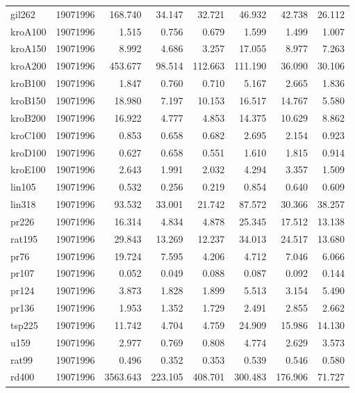 \begin{center}
\begin{longtable}{llrrrrrr}
gil262  & 19071996 & 168.740 & 34.147 & 32.721 & 46.932 & 42.738 & 26.112\\
kroA100  & 19071996 & 1.515 & 0.756 & 0.679 & 1.599 & 1.499 & 1.007\\
kroA150  & 19071996 & 8.992 & 4.686 & 3.257 & 17.055 & 8.977 & 7.263\\
kroA200  & 19071996 & 453.677 & 98.514 & 112.663 & 111.190 & 36.090 & 30.106\\
kroB100  & 19071996 & 1.847 & 0.760 & 0.710 & 5.167 & 2.665 & 1.836\\
kroB150  & 19071996 & 18.980 & 7.197 & 10.153 & 16.517 & 14.767 & 5.580\\
kroB200  & 19071996 & 16.922 & 4.777 & 4.853 & 14.375 & 10.629 & 8.862\\
kroC100  & 19071996 & 0.853 & 0.658 & 0.682 & 2.695 & 2.154 & 0.923\\
kroD100  & 19071996 & 0.627 & 0.658 & 0.551 & 1.610 & 1.815 & 0.914\\
kroE100  & 19071996 & 2.643 & 1.991 & 2.032 & 4.294 & 3.357 & 1.509\\
lin105  & 19071996 & 0.532 & 0.256 & 0.219 & 0.854 & 0.640 & 0.609\\
lin318  & 19071996 & 93.532 & 33.001 & 21.742 & 87.572 & 30.366 & 38.257\\
pr226  & 19071996 & 16.314 & 4.834 & 4.878 & 25.345 & 17.512 & 13.138\\
rat195  & 19071996 & 29.843 & 13.269 & 12.237 & 34.013 & 24.517 & 13.680\\
pr76  & 19071996 & 19.724 & 7.595 & 4.206 & 4.712 & 7.046 & 6.066\\
pr107  & 19071996 & 0.052 & 0.049 & 0.088 & 0.087 & 0.092 & 0.144\\
pr124  & 19071996 & 3.873 & 1.828 & 1.899 & 5.513 & 3.154 & 5.490\\
pr136  & 19071996 & 1.953 & 1.352 & 1.729 & 2.491 & 2.855 & 2.662\\
tsp225  & 19071996 & 11.742 & 4.704 & 4.759 & 24.909 & 15.986 & 14.130\\
u159  & 19071996 & 2.977 & 0.769 & 0.808 & 4.774 & 2.629 & 3.573\\
rat99  & 19071996 & 0.496 & 0.352 & 0.353 & 0.539 & 0.546 & 0.580\\
rd400  & 19071996 & 3563.643 & 223.105 & 408.701 & 300.483 & 176.906 & 71.727\\


\end{longtable}
\end{center}

